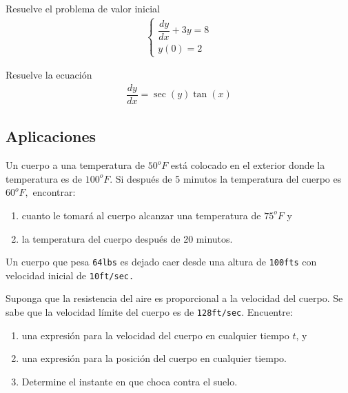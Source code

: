 \begin{problema}
	Resuelve el problema de valor inicial
\begin{align}
	\begin{cases}
		\dfrac{dy}{dx}+3y=8 \\
		y(0)=2
	\end{cases}
\end{align}
\end{problema}

\begin{problema}
	Resuelve la ecuación
	\begin{align}
		\dfrac{dy}{dx} = \sec(y)\tan(x)
	\end{align}
\end{problema}

\subsection{Aplicaciones}


\begin{problema}
	Un cuerpo a una temperatura de $50^{o}F$ está colocado en el exterior donde la temperatura es de $100^{o}F.$ Si después de 5 minutos la temperatura del cuerpo es $60^{o}F,$ encontrar:
	\begin{enumerate}
		\item cuanto le tomará al cuerpo alcanzar una temperatura de $75^{o}F$ y
		\item la temperatura del cuerpo después de 20 minutos.
	\end{enumerate}

\end{problema}

	\begin{problema}
	Un cuerpo que pesa \texttt{64lbs} es dejado caer desde una altura de \texttt{100fts} con velocidad inicial de \texttt{10ft/sec.}

	Suponga que la resistencia del aire es proporcional a la velocidad del cuerpo. Se sabe que la velocidad límite del cuerpo es de \texttt{128ft/sec}. Encuentre:
	\begin{enumerate}
		\item una expresión para la velocidad del cuerpo en cualquier tiempo $t$,  y
		\item una expresión para la posición del cuerpo en cualquier tiempo.
		\item Determine el instante en que choca contra el suelo.
	\end{enumerate}

\end{problema}


